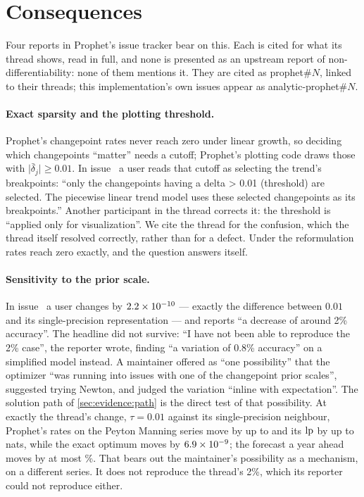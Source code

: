 \section{Consequences}
\label{sec:consequences}

Four reports in Prophet's issue tracker bear on this. Each is cited for what its
thread shows, read in full, and none is presented as an upstream report of
non-differentiability: none of them mentions it. They are cited as prophet\#$N$,
linked to their threads; this implementation's own issues appear as
analytic-prophet\#$N$.

\paragraph{Exact sparsity and the plotting threshold.}
Prophet's changepoint rates never reach zero under linear growth, so deciding
which changepoints ``matter'' needs a cutoff; Prophet's plotting code draws those
with $\lvert\bar\delta_j\rvert \ge 0.01$. In issue~ a user reads
that cutoff as selecting the trend's breakpoints: ``only the changepoints having a delta
> 0.01 (threshold) are selected. The piecewise linear trend model uses these selected
changepoints as its breakpoints.'' Another participant in the thread corrects it: the
threshold is ``applied only for visualization''. We cite the
thread for the confusion, which the thread itself resolved correctly, rather than
for a defect. Under the reformulation rates reach zero exactly, and the question
answers itself.

\paragraph{Sensitivity to the prior scale.}
In issue~ a user changes  by
$2.2\times10^{-10}$ --- exactly the difference between $0.01$ and its single-precision
representation --- and reports ``a decrease of around 2\% accuracy''. The headline did
not survive: ``I have not been able to reproduce the 2\% case'', the reporter wrote,
finding ``a variation of 0.8\% accuracy'' on a simplified model instead. A maintainer
offered as ``one possibility'' that the optimizer ``was running into issues with one of
the changepoint prior scales'', suggested trying Newton, and judged the variation
``inline with expectation''.
The solution path of \cref{sec:evidence:path} is the direct test of that
possibility. At exactly the thread's change, $\tau = 0.01$ against its single-precision
neighbour, Prophet's rates on the Peyton Manning series move by up to
\TauPairProphetFixed{} and its $\mathrm{lp}$ by up to \TauPairLpMax{} nats, while the exact
optimum moves by $6.9\times10^{-9}$; the forecast a year ahead moves by at most
\TauPairForecastMax\%. That bears out the maintainer's possibility as a mechanism, on a
different series. It does not reproduce the thread's 2\%, which its reporter could not
reproduce either.

